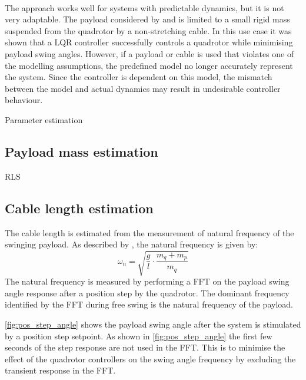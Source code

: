         \paragraph{} 
        The approach works well for systems with predictable dynamics, but it is not very adaptable.
        The payload considered by \cite{erasmus} and \cite{slabber} is limited to a small rigid mass suspended from the quadrotor by a non-stretching cable. 
        In this use case it was shown that a LQR controller successfully controls a quadrotor while minimising payload swing angles.
        However, if a payload or cable is used that violates one of the modelling assumptions, the predefined model no longer accurately represent the system.
        Since the controller is dependent on this model, the mismatch between the model and actual dynamics may result in undesirable controller behaviour.


    Parameter estimation

    \subsection{Payload mass estimation}
        RLS

    \subsection{Cable length estimation}
        The cable length is estimated from the measurement of natural frequency of the swinging payload.
        As described by
        \cite{bisgaard},
        the natural frequency is given by:
        \begin{equation} \label{eq:nat_freq}
            \omega_n = \sqrt{ \frac{g}{l} \cdot \frac{m_q + m_p}{m_q}}
        \end{equation}
        The natural frequency is measured by performing a FFT on the payload swing angle response after a position step by the quadrotor.
        The dominant frequency identified by the FFT during free swing is the natural frequency of the payload.
        
        \ref{fig:pos_step_angle}
        shows the payload swing angle after the system is stimulated by a position step setpoint.
        As shown in 
        \ref{fig:pos_step_angle}
        the first few seconds of the step response are not used in the FFT.
        This is to minimise the effect of the quadrotor controllers on the swing angle frequency 
        by excluding the transient response in the FFT.


